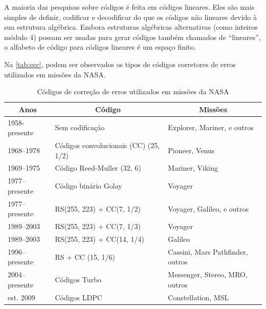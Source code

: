 \documentclass[
	12pt,				%
	openright,			%
	twoside,			%
	a4paper,			%
	english,			%
	french,				%
	spanish,			%
	brazil				%
	]{abntex2}
\newcommand{\quotes}[1]{``#1''}
\begin{document}
A maioria das pesquisas sobre códigos é feita em códigos lineares. Eles são mais simples de definir, codificar e decodificar do que os códigos não lineares devido à sua estrutura algébrica. Embora estruturas algébricas alternativas (como inteiros módulo 4) possam ser usadas para gerar códigos também chamados de \quotes{lineares}, o alfabeto de código para códigos lineares é um espaço finito.

Na \autoref{tab:ecc}, podem ser observados os tipos de códigos corretores de erros utilizados em missões da NASA.

\begin{table}[H]
\centering
\caption{Códigos de correção de erros utilizados em missões da NASA}
\label{tab:ecc}
\begin{tabular}{|l|l|l|} 
\hline
\multicolumn{1}{|c|}{Anos} & \multicolumn{1}{c|}{Código}           & \multicolumn{1}{c|}{Missões}      \\ 
\hline
1958-presente              & Sem codificação                       & Explorer, Mariner, e outros       \\
1968–1978                  & Códigos convolucionais (CC) (25, 1/2) & Pioneer, Venus                    \\
1969–1975                  & Código Reed-Muller (32, 6)            & Mariner, Viking                   \\
1977–presente              & Código binário Golay                  & Voyager                           \\
1977–presente              & RS(255, 223) + CC(7, 1/2)             & Voyager, Galileo, e outros        \\
1989–2003                  & RS(255, 223) + CC(7, 1/3)             & Voyager                           \\
1989–2003                  & RS(255, 223) + CC(14, 1/4)            & Galileo                           \\
1996–presente              & RS + CC (15, 1/6)                     & Cassini, Mars Pathfinder, outros  \\
2004–presente              & Códigos Turbo                         & Messenger, Stereo, MRO, outros    \\
est. 2009                  & Códigos LDPC                          & Constellation, MSL                \\
\hline
\end{tabular}
\end{table}
\end{document}
